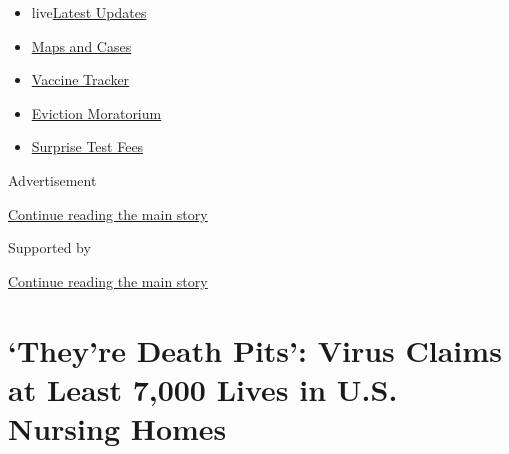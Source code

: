 \begin{itemize}
\tightlist
\item
  live\href{https://www.nytimes3xbfgragh.onion/2020/09/09/world/covid-19-coronavirus.html?name=styln-coronavirus-national\&region=TOP_BANNER\&block=storyline_menu_recirc\&action=click\&pgtype=Article\&impression_id=23aac8f0-f2bc-11ea-9197-0b8458576cb9\&variant=undefined}{Latest
  Updates}
\item
  \href{https://www.nytimes3xbfgragh.onion/interactive/2020/us/coronavirus-us-cases.html?name=styln-coronavirus-national\&region=TOP_BANNER\&block=storyline_menu_recirc\&action=click\&pgtype=Article\&impression_id=23aaf000-f2bc-11ea-9197-0b8458576cb9\&variant=undefined}{Maps
  and Cases}
\item
  \href{https://www.nytimes3xbfgragh.onion/interactive/2020/science/coronavirus-vaccine-tracker.html?name=styln-coronavirus-national\&region=TOP_BANNER\&block=storyline_menu_recirc\&action=click\&pgtype=Article\&impression_id=23aaf001-f2bc-11ea-9197-0b8458576cb9\&variant=undefined}{Vaccine
  Tracker}
\item
  \href{https://www.nytimes3xbfgragh.onion/2020/09/02/your-money/eviction-moratorium-covid.html?name=styln-coronavirus-national\&region=TOP_BANNER\&block=storyline_menu_recirc\&action=click\&pgtype=Article\&impression_id=23aaf002-f2bc-11ea-9197-0b8458576cb9\&variant=undefined}{Eviction
  Moratorium}
\item
  \href{https://www.nytimes3xbfgragh.onion/2020/09/09/upshot/coronavirus-surprise-test-fees.html?name=styln-coronavirus-national\&region=TOP_BANNER\&block=storyline_menu_recirc\&action=click\&pgtype=Article\&impression_id=23aaf003-f2bc-11ea-9197-0b8458576cb9\&variant=undefined}{Surprise
  Test Fees}
\end{itemize}

Advertisement

\protect\hyperlink{after-top}{Continue reading the main story}

Supported by

\protect\hyperlink{after-sponsor}{Continue reading the main story}

\hypertarget{theyre-death-pits-virus-claims-at-least-7000-lives-in-us-nursing-homes}{%
\section{`They're Death Pits': Virus Claims at Least 7,000 Lives in U.S.
Nursing
Homes}\label{theyre-death-pits-virus-claims-at-least-7000-lives-in-us-nursing-homes}}

